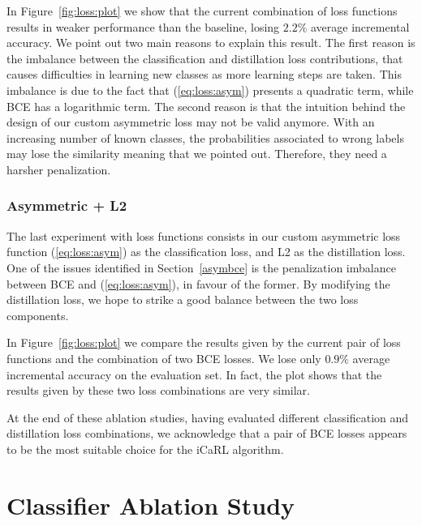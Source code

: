 \documentclass[10pt,twocolumn,letterpaper]{article}
\begin{document}
In Figure~\ref{fig:loss:plot} we show that the current combination of loss functions results in weaker performance than the baseline, losing $2.2\%$ average incremental accuracy. We point out two main reasons to explain this result. The first reason is the imbalance between the classification and distillation loss contributions, that causes difficulties in learning new classes as more learning steps are taken. This imbalance is due to the fact that (\ref{eq:loss:asym}) presents a quadratic term, while BCE has a logarithmic term. The second reason is that the intuition behind the design of our custom asymmetric loss may not be valid anymore. With an increasing number of known classes, the probabilities associated to wrong labels may lose the similarity meaning that we pointed out. Therefore, they need a harsher penalization.

\subsubsection{Asymmetric + L2}
The last experiment with loss functions consists in our custom asymmetric loss function (\ref{eq:loss:asym}) as the classification loss, and L2 as the distillation loss. One of the issues identified in Section~\ref{asymbce} is the penalization imbalance between BCE and (\ref{eq:loss:asym}), in favour of the former. By modifying the distillation loss, we hope to strike a good balance between the two loss components.

In Figure~\ref{fig:loss:plot} we compare the results given by the current pair of loss functions and the combination of two BCE losses. We lose only $0.9\%$ average incremental accuracy on the evaluation set. In fact, the plot shows that the results given by these two loss combinations are very similar.

At the end of these ablation studies, having evaluated different classification and distillation loss combinations, we acknowledge that a pair of BCE losses appears to be the most suitable choice for the iCaRL algorithm.

\section{Classifier Ablation Study}
\label{section:classifier}
\end{document}
